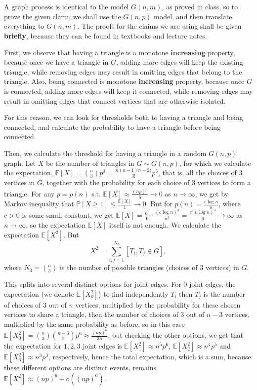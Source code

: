 \documentclass{article}
\begin{document}
\section{}
A graph process is identical to the model $G(n,m)$, as proved in class, so to prove the given claim, we shall use the $G(n,p)$ model, and then translate everything to $G(n,m)$. The proofs for the claims we are using shall be given \textbf{briefly}, because they can be found in textbooks and lecture notes.

First, we observe that having a triangle is a monotone \textbf{increasing} property, because once we have a triangle in $G$, adding more edges will keep the existing triangle, while removing edges may result in omitting edges that belong to the triangle. Also, being connected is monotone \textbf{increasing} property, because once $G$ is connected, adding more edges will keep it connected, while removing edges may result in omitting edges that connect vertices that are otherwise isolated.

For this reason, we can look for thresholds both to having a triangle and being connected, and calculate the probability to have a triangle before being connected.

Then, we calculate the threshold for having a triangle in a random $G(n,p)$ graph. Let $X$ be the number of triangles in $G\sim{G(n,p)}$, for which we calculate the expectation, $\mathbb{E}[X]=\binom{n}{3}p^3=\frac{n(n-1)n-2)}{3!}p^3$, that is, all the choices of $3$ vertices in $G$, together with the probability for each choice of $3$ vertices to form a triangle. For any $p=p(n)$ s.t. $\mathbb{E}[X]\approx\frac{(np)^3}{6}\rightarrow{0}$ as $n\rightarrow\infty$, we get by Markov inequality that $\mathbb{P}[X\geq{1}]\leq\frac{\mathbb{E}[X]}{1}\rightarrow{0}$. But for $p(n)=\frac{c\log{n}}{n}$, where $c>0$ is some small constant, we get $\mathbb{E}[X]=\frac{n^3}{6}\cdot\frac{(c\log{n})^3}{n^3}=\frac{c^3(\log{n})^3}{6}\rightarrow\infty$ as $n\rightarrow\infty$, so the expectation $\mathbb{E}[X]$ itself is not enough. We calculate the expectation $\mathbb{E}[X^2]$. But 
\[X^2=\sum_{i,j=1}^{N_3}[T_i,T_j\in{G}],\]
where $N_3=\binom{n}{3}$ is the number of possible triangles (choices of $3$ vertices) in $G$.

This splits into several distinct options for joint edges. For $0$ joint edges, the expectation (we denote $\mathbb{E}[X_0^2]$) to find independently $T_i$ then $T_j$ is the number of choices of $3$ out of $n$ vertices, multiplied by the probability for these chosen vertices to share a triangle, then the number of choices of $3$ out of $n-3$ vertices, multiplied by the same probability as before, so in this case $\mathbb{E}[X_0^2]=\binom{n}{3}\binom{n-3}{3}p^6\approx\frac{(np)^6}{36}$, but checking the other options, we get that the expectation for $1,2,3$ joint edges is $\mathbb{E}[X_1^2]\approx{n^5p^6}$, $\mathbb{E}[X_2^2]\approx{n^4p^5}$ and $\mathbb{E}[X_3^2]\approx{n^3p^3}$, respectively, hence the total expectation, which is a sum, because these different options are distinct events, remains $\mathbb{E}[X^2]\approx(np)^6+o((np)^6)$.
\end{document}
